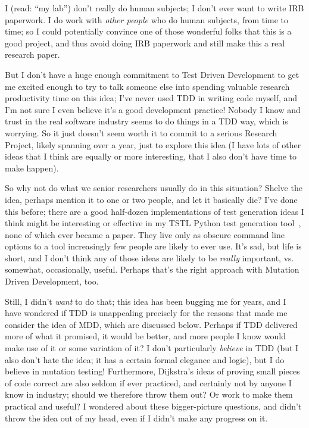 \documentclass[sigplan,screen]{acmart}
\begin{document}
I (read: ``my lab'') don't really do human subjects; I don't ever want to
write IRB paperwork.  I do work with \emph{other people} who do human subjects,
from time to time; so I could potentially convince one of those
wonderful folks that this is a good project, and thus avoid doing IRB
paperwork and still make this a real research paper.

But I don't have a huge enough commitment to Test
Driven Development to get me excited enough to try to talk someone
else into spending valuable research productivity time on this idea; I've never used
TDD in writing code myself, and I'm not sure I even believe it's a good development
practice!  Nobody I know and trust in the real software industry seems
to do things in a TDD way, which is worrying.  So it just doesn't
seem worth it to commit to a serious Research Project, likely spanning
over a year, just to explore this idea (I have lots of other ideas
that I think are equally or more interesting, that I also don't have
time to make happen).

So why not do what we senior researchers usually do in this situation?
Shelve the idea, perhaps mention it to one or two people, and let it
basically die?  I've done this before; there are a good half-dozen
implementations of test generation ideas I think might be interesting
or effective in my TSTL Python test generation tool~\cite{tstlsttt}, none of which
ever became a paper.  They live only as obscure command line options
to a tool increasingly few people are likely to ever use.  It's sad,
but life is short, and I don't think any of those ideas are likely to
be \emph{really} important, vs. somewhat, occasionally, useful.
Perhaps that's the right approach with Mutation Driven Development,
too.

Still, I didn't \emph{want} to do that; this idea has been bugging me
for years, and I have wondered if TDD is unappealing precisely for the
reasons that made me consider the idea of MDD, which are discussed
below.  Perhaps if TDD delivered more of what it promised, it would be
better, and more people I know would make use of it or some variation
of it?  I don't particularly \emph{believe} in TDD (but I also don't hate
the idea; it has a certain formal elegance and logic), but I do
believe in mutation testing!  Furthermore, Dijkstra's ideas of proving small pieces of code correct are
also seldom if ever practiced, and certainly not by anyone I know in industry; should we
therefore throw them out?  Or work to make them practical and useful?
I wondered about these bigger-picture questions, and didn't throw the idea out of my head, even if I didn't
make any progress on it.
\end{document}
